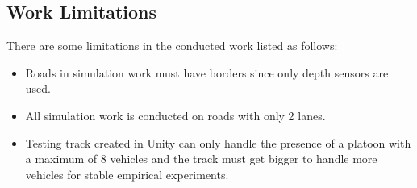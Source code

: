 \subsection{Work Limitations}
There are some limitations in the conducted work listed as follows:
\begin{itemize}
    \item Roads in simulation work must have borders since only depth sensors are used.
    \item All simulation work is conducted on roads with only 2 lanes.
    \item Testing track created in Unity can only handle the presence of a platoon with a maximum of 8 vehicles and the track must get bigger to handle more vehicles for stable empirical experiments.
\end{itemize}

